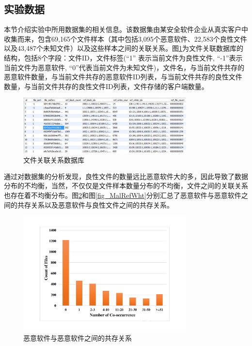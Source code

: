 \subsection{实验数据}
\label{sec:DataDes}
本节介绍实验中所用数据集的相关信息。该数据集由某安全软件企业从真实客户中收集而来，包含69,165个文件样本（其中包括3,095个恶意软件、22,583个良性文件以及43,487个未知文件）以及这些样本之间的关联关系\cite{ye2011combining}。图\ref{fig_Database}为文件关联数据库的结构，包括8个字段：文件ID，文件标签(``1'' 表示当前文件为良性文件, ``-1''表示当前文件为恶意软件,  ``0''代表当前文件为未知文件)，文件名，与当前文件共存的恶意软件数量，与当前文件共存的恶意软件ID列表，与当前文件共存的良性文件数量，与当前文件共存的良性文件ID列表，文件存储的客户端数量。

\begin{figure}[!ht]
\centering
\includegraphics[width=3.5in]{img/chap2/Database.pdf}
\caption{文件关联关系数据库}
\label{fig_Database}
\end{figure}

通过对数据集的分析发现，良性文件的数量远比恶意软件大的多，因此导致了数据分布的不均衡，当然，不仅仅是文件样本数量分布的不均衡，文件之间的关联关系也存在着不均衡分布。图\ref{fig_MalRef}和图\ref{fig_MalRefWht}分别汇总了恶意软件与恶意软件之间的共存关系以及恶意软件与良性文件之间的共存关系。

\begin{figure}[!ht]
\centering
\includegraphics[width=3.5in]{img/chap2/MalRefCount.pdf}
\caption{恶意软件与恶意软件之间的共存关系}
\label{fig_MalRef}
\end{figure}

